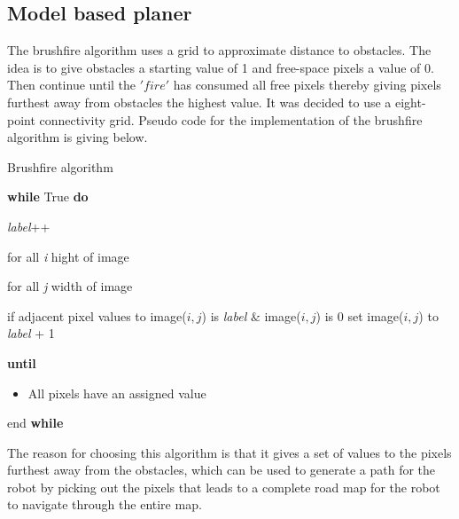 \documentclass[../Head/Main.tex]{subfiles}
\begin{document}
\subsection{Model based planer}

The brushfire algorithm uses a grid to approximate distance to obstacles. The idea is to give obstacles a starting value of 1 and free-space pixels a value of 0. Then continue until the $'fire'$ has consumed all free pixels thereby giving pixels furthest away from obstacles the highest value. It was decided to use a eight-point connectivity grid. Pseudo code for the implementation of the brushfire algorithm is giving below.          

\begin{Pseudo}{Brushfire algorithm}{}

	\textbf{while} True \textbf{do}
	

	\begin{Indentation}
	\item \textit{label}++
	\begin{Indentation}

	\item for all \textit{i} hight of image 
	\begin{Indentation}
	\item for all \textit{j} width of image 
	\item if adjacent pixel values to image($i, j $) is \textit{label} $\&$ image($i, j$) is 0 set image($i, j $) to \textit{label} + 1	
	
	\end{Indentation}
	
	\item \textbf{until}
				
	\begin{itemize}
	\item All pixels have an assigned value 
	\end{itemize}

	\end{Indentation}
	
	 \item end \textbf{while}

	\end{Indentation}
	
\end{Pseudo}

The reason for choosing this algorithm is that it gives a set of values to the pixels furthest away from the obstacles, which can be used to generate a path for the robot by picking out the pixels that leads to a complete road map for the robot to navigate through the entire map. 
\end{document}

